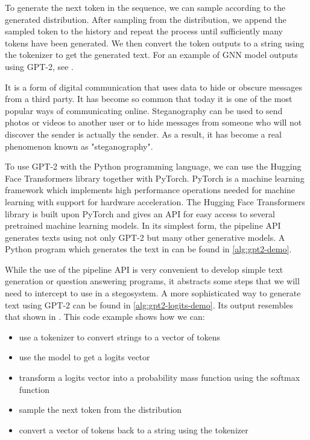 To generate the next token in the sequence, we can sample according to the generated distribution.
After sampling from the distribution, we append the sampled token to the history and repeat the process until sufficiently many tokens have been generated.
We then convert the token outputs to a string using the tokenizer to get the generated text.
For an example of GNN model outputs using GPT-2, see .

\begin{example}
It is a form of digital communication that uses data to hide or obscure messages from a third party. It has become so common that today it is one of the most popular ways of communicating online. Steganography can be used to send photos or videos to another user or to hide messages from someone who will not discover the sender is actually the sender. As a result, it has become a real phenomenon known as "steganography".
	\label{example:gpt2-output-sample}
\end{example}

To use GPT-2 with the Python programming language, we can use the Hugging Face Transformers library together with PyTorch.
PyTorch is a machine learning framework which implements high performance operations needed for machine learning with support for hardware acceleration.
The Hugging Face Transformers library is built upon PyTorch and gives an API for easy access to several pretrained machine learning models.
In its simplest form, the pipeline API generates texts using not only GPT-2 but many other generative models.
A Python program which generates the text in  can be found in \autoref{alg:gpt2-demo}.

While the use of the pipeline API is very convenient to develop simple text generation or question answering programs, it abstracts some steps that we will need to intercept to use in a stegosystem.
A more sophisticated way to generate text using GPT-2 can be found in \autoref{alg:gpt2-logits-demo}.
Its output resembles that shown in . 
This code example shows how we can:

\begin{itemize}
	\item use a tokenizer to convert strings to a vector of tokens
	\item use the model to get a logits vector
	\item transform a logits vector into a probability mass function using the softmax function
	\item sample the next token from the distribution
	\item convert a vector of tokens back to a string using the tokenizer
\end{itemize}


